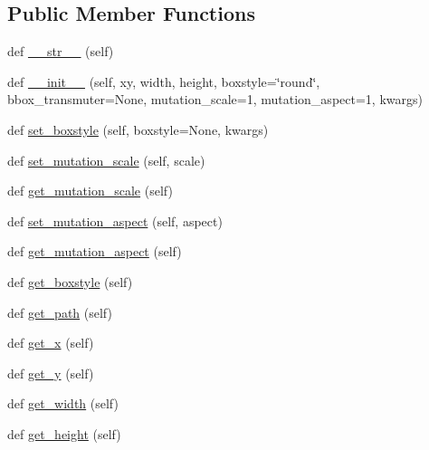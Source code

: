 \subsection*{Public Member Functions}
\begin{DoxyCompactItemize}
\item 
def \hyperlink{classmatplotlib_1_1patches_1_1FancyBboxPatch_a0908095ba902f18353306e4a4c3e3594}{\+\_\+\+\_\+str\+\_\+\+\_\+} (self)
\item 
def \hyperlink{classmatplotlib_1_1patches_1_1FancyBboxPatch_a788b262647aee82e1b3da4275ee63a6a}{\+\_\+\+\_\+init\+\_\+\+\_\+} (self, xy, width, height, boxstyle=\char`\"{}round\char`\"{}, bbox\+\_\+transmuter=None, mutation\+\_\+scale=1, mutation\+\_\+aspect=1, kwargs)
\item 
def \hyperlink{classmatplotlib_1_1patches_1_1FancyBboxPatch_aa523ab2aca55a71615448918e5b94218}{set\+\_\+boxstyle} (self, boxstyle=None, kwargs)
\item 
def \hyperlink{classmatplotlib_1_1patches_1_1FancyBboxPatch_ad24eb5514bafe2945baa51a61fb77af4}{set\+\_\+mutation\+\_\+scale} (self, scale)
\item 
def \hyperlink{classmatplotlib_1_1patches_1_1FancyBboxPatch_afb9a44f9497059b24726ee32295526fd}{get\+\_\+mutation\+\_\+scale} (self)
\item 
def \hyperlink{classmatplotlib_1_1patches_1_1FancyBboxPatch_aff9304f049d9dc36c4565cc8890d6803}{set\+\_\+mutation\+\_\+aspect} (self, aspect)
\item 
def \hyperlink{classmatplotlib_1_1patches_1_1FancyBboxPatch_ab7db85bf33b8a5b86d2554457923827b}{get\+\_\+mutation\+\_\+aspect} (self)
\item 
def \hyperlink{classmatplotlib_1_1patches_1_1FancyBboxPatch_a78f36a4a10fae161672f7e971bf3aec6}{get\+\_\+boxstyle} (self)
\item 
def \hyperlink{classmatplotlib_1_1patches_1_1FancyBboxPatch_a8dbb4e7a4264549ca13ffd90d00c6597}{get\+\_\+path} (self)
\item 
def \hyperlink{classmatplotlib_1_1patches_1_1FancyBboxPatch_a2bcd1a4b5aca4e7650fdcb13497b450b}{get\+\_\+x} (self)
\item 
def \hyperlink{classmatplotlib_1_1patches_1_1FancyBboxPatch_ad75e9464d0e74678f06ab84de2c1dfb4}{get\+\_\+y} (self)
\item 
def \hyperlink{classmatplotlib_1_1patches_1_1FancyBboxPatch_af32a088e1ea7a1e62db691571ff698e1}{get\+\_\+width} (self)
\item 
def \hyperlink{classmatplotlib_1_1patches_1_1FancyBboxPatch_a5772410b22ed794f05be73ca986e4bd8}{get\+\_\+height} (self)

\end{DoxyCompactItemize}
